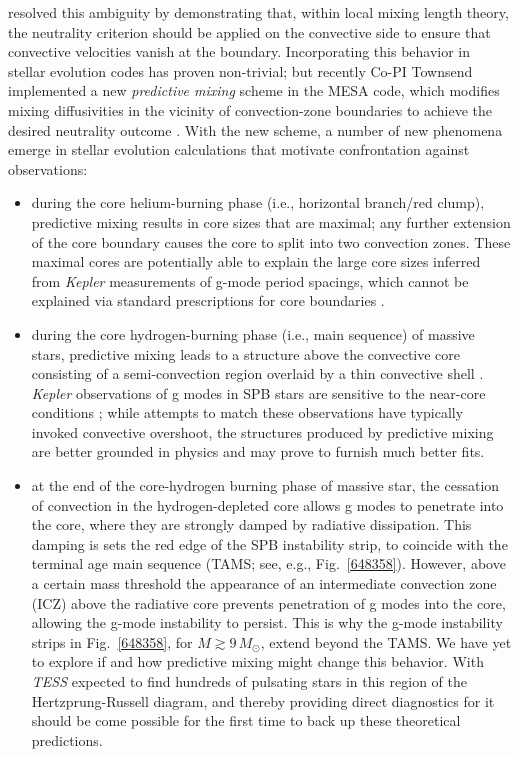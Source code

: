 \citet{Gabriel:2014} resolved this ambiguity by demonstrating that, within local mixing length theory, the neutrality criterion should be applied on the convective side to ensure that convective velocities vanish at the boundary. Incorporating this behavior in stellar evolution codes has proven non-trivial; but recently Co-PI Townsend implemented a new \emph{predictive mixing} scheme in the MESA code, which modifies mixing diffusivities in the vicinity of convection-zone boundaries to achieve the desired neutrality outcome \citep[see][]{Paxton:2017}. With the new scheme, a number of new phenomena emerge in stellar evolution calculations that motivate confrontation against observations:
\begin{itemize}
\item during the core helium-burning phase (i.e., horizontal branch/red clump), predictive mixing results in core sizes that are maximal; any further extension of the core boundary causes the core to split into two convection zones. These maximal cores are potentially able to explain the large core sizes inferred from \emph{Kepler} measurements of g-mode period spacings, which cannot be explained via standard prescriptions for core boundaries \citep[e.g.,][and reference therein]{Constantino:2015}.
\item during the core hydrogen-burning phase (i.e., main sequence) of massive stars, predictive mixing leads to a structure above the convective core consisting of a semi-convection region overlaid by a thin convective shell \citep[see, e.g., the right-hand panel in Fig.~4 of][]{Paxton:2017}. \emph{Kepler} observations of g modes in SPB stars are sensitive to the near-core conditions \citep[e.g.,][]{Moravveji:2015}; while attempts to match these observations have typically invoked convective overshoot, the structures produced by predictive mixing are better grounded in physics and may prove to furnish much better fits.
\item at the end of the core-hydrogen burning phase of massive star, the cessation of convection in the hydrogen-depleted core allows g modes to penetrate into the core, where they are strongly damped by radiative dissipation. This damping is sets the red edge of the SPB instability strip, to coincide with the terminal age main sequence (TAMS; see, e.g., Fig.~\ref{648358}). However, above a certain mass threshold the appearance of an intermediate convection zone (ICZ) above the radiative core prevents penetration of g modes into the core, allowing the g-mode instability to persist. This is why the g-mode instability strips in Fig.~\ref{648358}, for $M \gtrsim 9\,M_{\odot}$, extend beyond the TAMS. We have yet to explore if and how predictive mixing might change this behavior. With \emph{TESS} expected to find hundreds of pulsating stars in this region of the Hertzprung-Russell diagram, and thereby providing direct diagnostics for it should be come possible for the first time to back up these theoretical predictions.
\end{itemize}
